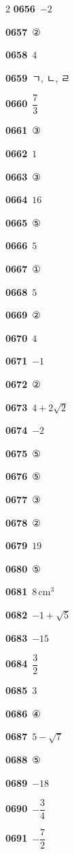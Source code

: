 \documentclass[10pt,a4paper]{article}
\begin{document}
\begin{multicols}{2}
\noindent\textbf{0656}\ $-2$\par
\noindent\textbf{0657}\ ②\par
\noindent\textbf{0658}\ $4$\par
\noindent\textbf{0659}\ ㄱ, ㄴ, ㄹ\par
\noindent\textbf{0660}\ $\dfrac{7}{3}$\par
\noindent\textbf{0661}\ ③\par
\noindent\textbf{0662}\ $1$\par
\noindent\textbf{0663}\ ③\par
\noindent\textbf{0664}\ $16$\par
\noindent\textbf{0665}\ ⑤\par
\noindent\textbf{0666}\ $5$\par
\noindent\textbf{0667}\ ①\par
\noindent\textbf{0668}\ $5$\par
\noindent\textbf{0669}\ ②\par
\noindent\textbf{0670}\ $4$\par
\noindent\textbf{0671}\ $-1$\par
\noindent\textbf{0672}\ ②\par
\noindent\textbf{0673}\ $4+2\sqrt{2}$\par
\noindent\textbf{0674}\ $-2$\par
\noindent\textbf{0675}\ ⑤\par
\noindent\textbf{0676}\ ⑤\par
\noindent\textbf{0677}\ ③\par
\noindent\textbf{0678}\ ②\par
\noindent\textbf{0679}\ $19$\par
\noindent\textbf{0680}\ ⑤\par
\noindent\textbf{0681}\ $8\,\mathrm{cm}^3$\par
\noindent\textbf{0682}\ $-1+\sqrt{5}$\par
\noindent\textbf{0683}\ $-15$\par
\noindent\textbf{0684}\ $\dfrac{3}{2}$\par
\noindent\textbf{0685}\ $3$\par
\noindent\textbf{0686}\ ④\par
\noindent\textbf{0687}\ $5-\sqrt{7}$\par
\noindent\textbf{0688}\ ⑤\par
\noindent\textbf{0689}\ $-18$\par
\noindent\textbf{0690}\ $-\dfrac{3}{4}$\par
\noindent\textbf{0691}\ $-\dfrac{7}{2}$\par

\end{multicols}
\end{document}

